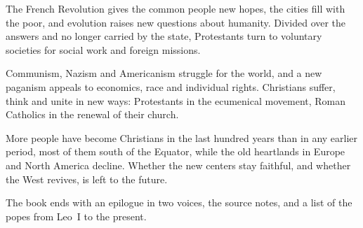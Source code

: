 {The French Revolution gives the common people new hopes, the cities fill with the poor, and evolution
raises new questions about humanity. Divided over the answers and no longer carried by the state,
Protestants turn to voluntary societies for social work and foreign missions.}

{Communism, Nazism and Americanism struggle for the world, and a new paganism appeals to economics,
race and individual rights. Christians suffer, think and unite in new ways: Protestants in the
ecumenical movement, Roman Catholics in the renewal of their church.}

{More people have become Christians in the last hundred years than in any earlier period, most of them
south of the Equator, while the old heartlands in Europe and North America decline. Whether the new
centers stay faithful, and whether the West revives, is left to the future.}

\par{}
\noindent The book ends with an epilogue in two voices, the source notes, and a list of the popes from
Leo~I to the present.
